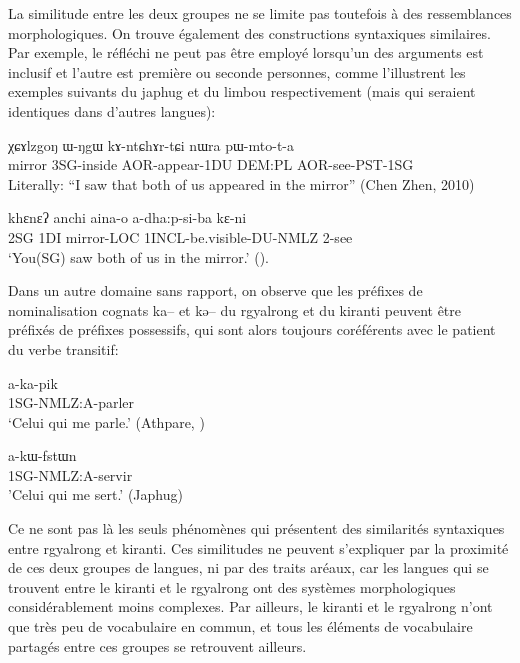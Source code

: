 \documentclass[oldfontcommands,oneside,a4paper,11pt]{memoir}
\begin{document}
La similitude entre les deux groupes ne se limite pas toutefois à des ressemblances morphologiques. On trouve également des constructions syntaxiques similaires. Par exemple, le réfléchi ne peut pas être employé lorsqu'un des arguments est inclusif et l'autre est première ou seconde personnes, comme l'illustrent les exemples suivants du japhug et du limbou respectivement (mais qui seraient identiques dans d'autres langues):

\begin{exe}
\ex \label{ex:refl1}
\gll	χɕɤlzgoŋ 	ɯ-ŋgɯ 		kɤ-ntɕhɤr-tɕi 	nɯra 	pɯ-mto-t-a \\
mirror		3SG-inside	AOR-appear-1DU	DEM:PL	AOR-see-PST-1SG \\
\glt	Literally: “I saw that both of us appeared in the mirror” (Chen Zhen, 2010)
\end{exe}

\begin{exe}
\ex \label{ex:refl2}
\gll
khɛnɛʔ	anchi	aina-o		a-dha:p-si-ba				kɛ-ni \\
	2SG		1DI		mirror-LOC	1INCL-be.visible-DU-NMLZ	2-see \\
\glt	‘You(SG) saw both of us in the mirror.’ (\citealt[277]{driem90hayu}).
\end{exe}

Dans un autre domaine sans rapport, on observe que les préfixes de nominalisation cognats ka-- et kə-- du rgyalrong et du kiranti peuvent être préfixés de préfixes possessifs, qui sont alors toujours coréférents avec le patient du verbe transitif:
\begin{exe}
\ex \label{ex:ka1}
\gll	a-ka-pik \\
1SG-NMLZ:A-parler \\
\glt ‘Celui qui me parle.’ (Athpare, \citealt[514]{ebert03kiranti})
\end{exe}

\begin{exe}
\ex \label{ex:ka2}
\gll	a-kɯ-fstɯn \\
1SG-NMLZ:A-servir \\
\glt 'Celui qui me sert.’ (Japhug)
\end{exe}

Ce ne sont pas là les seuls phénomènes qui présentent des similarités syntaxiques entre rgyalrong et kiranti. Ces similitudes ne peuvent s'expliquer par la proximité de ces deux groupes de langues, ni par des traits aréaux, car les langues qui se trouvent entre le kiranti et le rgyalrong ont des systèmes morphologiques considérablement moins complexes. Par ailleurs, le kiranti et le rgyalrong n'ont que très peu de vocabulaire en commun, et tous les éléments de vocabulaire partagés entre ces groupes se retrouvent ailleurs. 
\end{document}
